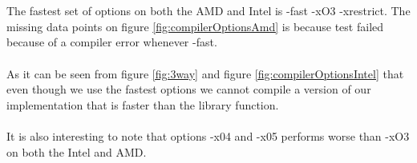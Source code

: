 \\\\
The fastest set of options on both the AMD and Intel is -fast -xO3 -xrestrict. The missing data points on figure \ref{fig:compilerOptionsAmd} is because test failed because of a compiler error whenever -fast. 
\\\\
As it can be seen from figure \ref{fig:3way} and figure \ref{fig:compilerOptionsIntel} that even though we use the fastest options we cannot compile a version of our implementation that is faster than the library function. 
\\\\
It is also interesting to note that options -x04 and -x05 performs worse than -xO3 on both the Intel and AMD. 